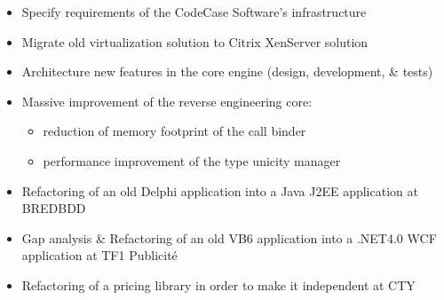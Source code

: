 \documentclass[11pt, a4paper]{moderncv}
\begin{document}
\vspace{1em}
{
  \begin{itemize}
    \renewcommand{\labelitemi}{$\bullet$  }
    \item Specify requirements of the CodeCase Software's infrastructure
    \item Migrate old virtualization solution to Citrix XenServer solution
  \end{itemize}
}
{
  \begin{itemize}
    \renewcommand{\labelitemi}{$\bullet$  }
    \item Architecture new features in the core engine (design, development, \& tests)
    \item Massive improvement of the reverse engineering core:
      \begin{itemize}
        \item reduction of memory footprint of the call binder
        \item performance improvement of the type unicity manager
      \end{itemize}
  \end{itemize}
}
{
  \begin{itemize}
    \renewcommand{\labelitemi}{$\bullet$  }
    \item Refactoring of an old Delphi application into a Java J2EE application at BREDBDD
    \item Gap analysis \& Refactoring of an old VB6 application into a .NET4.0 WCF application at TF1 Publicit\'e
    \item Refactoring of a pricing library in order to make it independent at CTY
  \end{itemize}
}
\vspace{1em}
\end{document}
